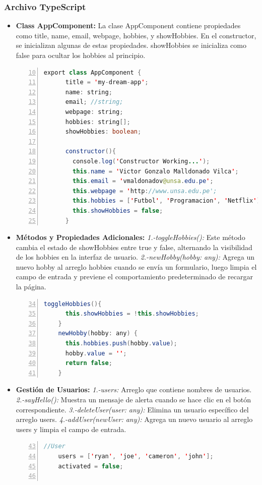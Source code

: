 \documentclass{article}
\begin{document}
  \subsubsection{Archivo TypeScript}
  \begin{itemize}
    \item \textbf{Class AppComponent: }La clase AppComponent contiene propiedades como title, name, email, 
    webpage, hobbies, y showHobbies. En el constructor, se inicializan algunas de estas propiedades. showHobbies 
    se inicializa como false para ocultar los hobbies al principio.
    \begin{lstlisting}[language=java, numbers=left, firstnumber=10, numberstyle=\color{black}]
    export class AppComponent {
      title = 'my-dream-app';
      name: string;
      email; //string;
      webpage: string;
      hobbies: string[];
      showHobbies: boolean;
    
      constructor(){
        console.log('Constructor Working...');
        this.name = 'Victor Gonzalo Malldonado Vilca';
        this.email = 'vmaldonadov@unsa.edu.pe';
        this.webpage = 'http://www.unsa.edu.pe';
        this.hobbies = ['Futbol', 'Programacion', 'Netflix'];
        this.showHobbies = false;
      }
    \end{lstlisting}
    \item \textbf{Métodos y Propiedades Adicionales: }
    \newline
    \textit{1.-toggleHobbies():} Este método cambia el estado de showHobbies entre true y false, alternando la visibilidad 
    de los hobbies en la interfaz de usuario.
    \newline
    \textit{2.-newHobby(hobby: any):} Agrega un nuevo hobby al arreglo hobbies cuando se envía un formulario, luego 
    limpia el campo de entrada y previene el comportamiento predeterminado de recargar la página.
    \newpage
    \begin{lstlisting}[language=java, numbers=left, firstnumber=34, numberstyle=\color{black}]
    toggleHobbies(){
      this.showHobbies = !this.showHobbies;
    }
    newHobby(hobby: any) {
      this.hobbies.push(hobby.value);
      hobby.value = '';
      return false;
    }
    \end{lstlisting}
    \item \textbf{Gestión de Usuarios: }
    \newline
    \textit{1.-users:} Arreglo que contiene nombres de usuarios.
    \newline
    \textit{2.-sayHello():} Muestra un mensaje de alerta cuando se hace clic en el botón correspondiente.
    \textit{3.-deleteUser(user: any):} Elimina un usuario específico del arreglo users.
    \newline
    \textit{4.-addUser(newUser: any):} Agrega un nuevo usuario al arreglo users y limpia el campo de entrada.
    \begin{lstlisting}[language=java, numbers=left, firstnumber=43, numberstyle=\color{black}]
    //User
    users = ['ryan', 'joe', 'cameron', 'john'];
    activated = false;
    

\end{lstlisting}
\end{itemize}
\end{document}
